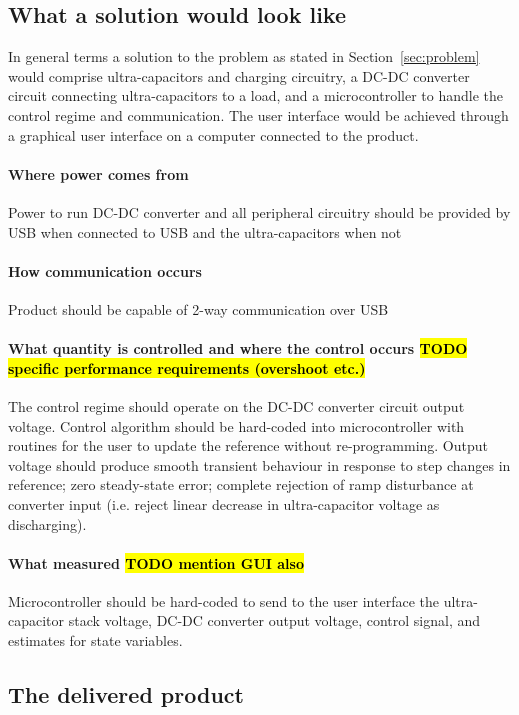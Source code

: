\subsection{What a solution would look like}\label{sec:objectives}
In general terms a solution to the problem as stated in Section~\ref{sec:problem} would comprise ultra-capacitors and charging circuitry, a DC-DC converter circuit connecting ultra-capacitors to a load, and a microcontroller to handle the control regime and communication. The user interface would be achieved through a graphical user interface on a computer connected to the product.
\paragraph{Where power comes from}
Power to run DC-DC converter and all peripheral circuitry should be provided by USB when connected to USB and the ultra-capacitors when not
\paragraph{How communication occurs}
Product should be capable of 2-way communication over USB
\paragraph{What quantity is controlled and where the control occurs \hl{TODO specific performance requirements (overshoot etc.)}}
The control regime should operate on the DC-DC converter circuit output voltage. Control algorithm should be hard-coded into microcontroller with routines for the user to update the reference without re-programming.
\newpar
Output voltage should produce smooth transient behaviour in response to step changes in reference; zero steady-state error; complete rejection of ramp disturbance at converter input (i.e. reject linear decrease in ultra-capacitor voltage as discharging).
\paragraph{What measured \hl{TODO mention GUI also}}
Microcontroller should be hard-coded to send to the user interface the ultra-capacitor stack voltage, DC-DC converter output voltage, control signal, and estimates for state variables.
\subsection{The delivered product}\label{sec:delivered}
